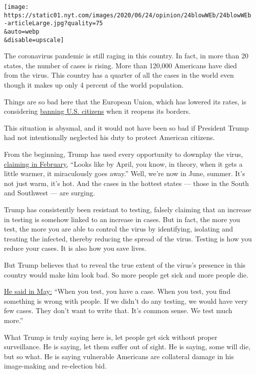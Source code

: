 \texttt{[image: https://static01.nyt.com/images/2020/06/24/opinion/24blowWEb/24blowWEb-articleLarge.jpg?quality=75\\\&auto=webp\\\&disable=upscale]}

The coronavirus pandemic is still raging in this country. In fact, in
more than 20 states, the number of cases is rising. More than 120,000
Americans have died from the virus. This country has a quarter of all
the cases in the world even though it makes up only 4 percent of the
world population.

Things are so bad here that the European Union, which has lowered its
rates, is considering
\href{https://www.nytimes.com/2020/06/23/world/europe/coronavirus-EU-American-travel-ban.html}{banning
U.S. citizens} when it reopens its borders.

This situation is abysmal, and it would not have been so bad if
President Trump had not intentionally neglected his duty to protect
American citizens.

From the beginning, Trump has used every opportunity to downplay the
virus,
\href{https://factba.se/transcript/donald-trump-speech-kag-rally-manchester-new-hampshire-february-10-2020}{claiming
in February,} ``Looks like by April, you know, in theory, when it gets a
little warmer, it miraculously goes away.'' Well, we're now in June,
summer. It's not just warm, it's hot. And the cases in the hottest
states --- those in the South and Southwest --- are surging.

Trump has consistently been resistant to testing, falsely claiming that
an increase in testing is somehow linked to an increase in cases. But in
fact, the more you test, the more you are able to control the virus by
identifying, isolating and treating the infected, thereby reducing the
spread of the virus. Testing is how you reduce your cases. It is also
how you save lives.

But Trump believes that to reveal the true extent of the virus's
presence in this country would make him look bad. So more people get
sick and more people die.

\href{https://www.marketwatch.com/story/trump-says-coronavirus-testing-overratedclaims-fewer-cases-if-no-testing-2020-05-14}{He
said in May:} ``When you test, you have a case. When you test, you find
something is wrong with people. If we didn't do any testing, we would
have very few cases. They don't want to write that. It's common sense.
We test much more.''

What Trump is truly saying here is, let people get sick without proper
surveillance. He is saying, let them suffer out of sight. He is saying,
some will die, but so what. He is saying vulnerable Americans are
collateral damage in his image-making and re-election bid.


